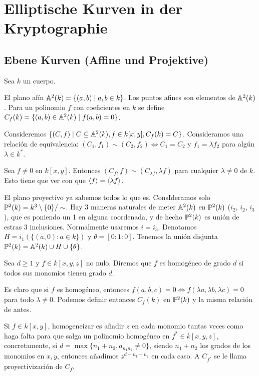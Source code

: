 \documentclass[CR.tex]{subfiles}
\begin{document}

\chapter{Elliptische Kurven in der Kryptographie}
\section{Ebene Kurven (Affine und Projektive)}
Sea $k$ un cuerpo. 
\begin{defi}
El plano afín $\mathbb{A}^2(k)=\{(a,b)\mid a,b\in k\}$. Los puntos afines son elementos de $\mathbb{A}^2(k)$. Para un polinomio $f$ con coeficientes en $k$ se define $C_f(k)=\{(a,b)\in\mathbb{A}^2(k)\mid f(a,b)=0\}$. 
\end{defi}

Consideremos $\{(C,f)\mid C\subseteq\mathbb{A}^2(k), f\in k[x,y], C_f(k)=C\}$. Consideramos una relación de equivalencia: $(C_1,f_1)\sim (C_2,f_2)\Leftrightarrow C_1=C_2$ y $f_1=\lambda f_2$ para algún $\lambda\in k^*$. 

\begin{nota}
Sea $f\neq 0$ en $k[x,y]$. Entonces $(C_f,f)\sim (C_{\lambda f},\lambda f)$ para cualquier $\lambda\neq 0$ de $k$. Esto tiene que ver con que $\langle{f}\rangle=\langle{\lambda f}\rangle$.
\end{nota}

El plano proyectivo ya sabemos todos lo que es. ConsIderamos solo $\mathbb{P}^2(k)=k^3\setminus\{0\}/\sim$. Hay 3 maneras naturales de meter $\mathbb{A}^2(k)$ en $\mathbb{P}^2(k)$ ($i_2$, $i_2$, $i_3$), que es poniendo un 1 en alguna coordenada, y de hecho $\mathbb{P}^2(k)$ es unión de estras 3 inclusiones. Normalmente usaremos $i=i_3$. Denotamos $H=i_1(\{(a,0):a\in k\})$ y $\theta=[0:1:0]$. Tenemos la unión disjunta $\mathbb{P}^2(k)=\mathbb{A}^2(k)\cup H\cup \{\theta\}$. 

\begin{defi}
Sea $d\geq 1$ y $f\in k[x,y,z]$ no nulo. Diremos que $f$ es homogéneo de grado $d$ si todos sus monomios tienen grado $d$. 
\end{defi}

Es claro que si $f$ es homogéneo, entonces $f(a,b,c)=0\Leftrightarrow f(\lambda a,\lambda b,\lambda c)=0$ para todo $\lambda\neq 0$. Podemos definir entonces $C_f(k)$ en $\mathbb{P}^2(k)$ y la misma relación de antes. 

Si $f\in k[x,y]$, homogeneizar es añadir $z$ en cada monomio tantas veces como haga falta para que salga un polinomio homogéneo en $f^*\in k[x,y,z]$, concretamente, si $d=\max\{n_1+n_2, a_{n_1 n_2}\neq 0\}$, siendo $n_1+n_2$ los grados de los monomios en $x,y$, entonces añadimos $z^{d-n_1-n_2}$ en cada caso. A $C_{f^*}$ se le llama proyectivización de $C_f$. 
\end{document}
